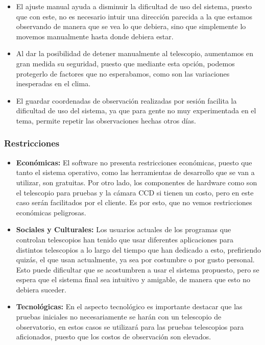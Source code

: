 \documentclass[letterpaper,spanish,10pt]{article}
\begin{document}
\begin{itemize}
	\item El ajuste manual ayuda a disminuir la dificultad de uso del sistema, 
puesto que con este, no es necesario intuir una direcci\'on parecida a la que 
estamos observando de manera que se vea lo que debiera, sino que simplemente 
lo movemos manualmente hasta donde debiera estar.

	\item Al dar la posibilidad de detener manualmente al telescopio, aumentamos 
en gran medida su seguridad, puesto que mediante esta opci\'on, podemos protegerlo 
de factores que no esperabamos, como son las variaciones inesperadas en el clima. 

	\item El guardar coordenadas de observaci\'on realizadas por sesi\'on facilita 
la dificultad de uso del sistema, ya que para gente no muy experimentada en el tema, 
permite repetir las observaciones hechas otros d\'ias.

	\end{itemize}

\subsubsection{Restricciones}

\begin{itemize}

\item \textbf{Econ\'omicas:} El software no presenta restricciones econ\'omicas, 
puesto que tanto el sistema operativo, como las herramientas de desarrollo que se 
van a utilizar, son gratuitas. Por otro lado, los componentes de hardware como son 
el telescopio para pruebas y la c\'amara CCD si tienen un costo, pero en este caso 
ser\'an facilitados por el cliente. Es por esto, que no vemos restricciones 
econ\'omicas peligrosas.

\item \textbf{Sociales y Culturales:} Los usuarios actuales de los programas que 
controlan telescopios han tenido que usar diferentes aplicaciones para distintos 
telescopios a lo largo del tiempo que han dedicado a esto, prefiriendo quiz\'as, 
el que usan actualmente, ya sea por costumbre o por gusto personal. Esto puede 
dificultar que se acostumbren a usar el sistema propuesto, pero se espera que el 
sistema final sea intuitivo y amigable, de manera que esto no debiera suceder.

\item \textbf{Tecnol\'ogicas:} En el aspecto tecnol\'ogico es importante destacar 
que las pruebas iniciales no necesariamente se har\'an con un telescopio de 
observatorio, en estos casos se utilizar\'a para las pruebas telescopios para 
aficionados, puesto que los costos de observaci\'on son elevados.



\end{itemize}
\end{document}
